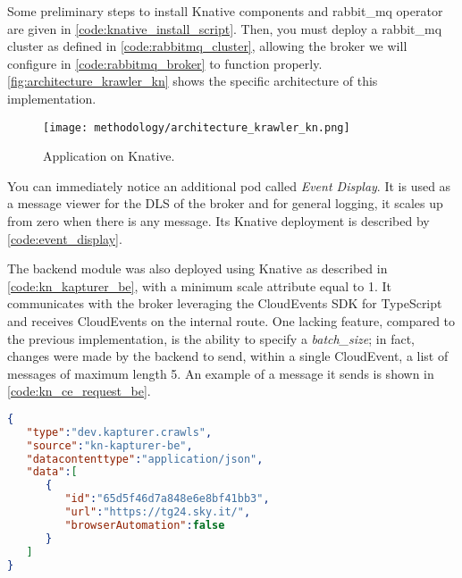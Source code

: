 \documentclass[../thesis.tex]{subfiles}
\begin{document}
Some preliminary steps to install Knative components and \gls{rabbit_mq} operator are given in \autoref{code:knative_install_script}. Then, you must deploy a \gls{rabbit_mq} cluster as defined in \autoref{code:rabbitmq_cluster}, allowing the broker we will configure in \autoref{code:rabbitmq_broker} to function properly. \autoref{fig:architecture_krawler_kn} shows the specific architecture of this implementation.

\begin{figure}[H]
    \centering
    \texttt{[image: methodology/architecture\_krawler\_kn.png]}
    \caption[Knative implementation]{Application on Knative.}
    \label{fig:architecture_krawler_kn}
\end{figure}

You can immediately notice an additional \gls{pod} called \textit{Event Display}. It is used as a message viewer for the \acrfull{DLS} of the broker and for general logging, it scales up from zero when there is any message. Its Knative deployment is described by \autoref{code:event_display}.

The backend module was also deployed using Knative as described in \autoref{code:kn_kapturer_be}, with a minimum scale attribute equal to 1. It communicates with the broker leveraging the CloudEvents \acrshort{SDK} \cite{site:cloudevents_js} for TypeScript and receives CloudEvents on the internal route. One lacking feature, compared to the previous implementation, is the ability to specify a \textit{batch\_size}; in fact, changes were made by the backend to send, within a single CloudEvent, a list of messages of maximum length 5. An example of a message it sends is shown in \autoref{code:kn_ce_request_be}.

\begin{lstlisting}[language=json, captionpos=b, caption={[Sample of search start message from backend]Example of search start message on Knative from backend module. The mandatory fields that CloudEvents must have were not reported.}, label={code:kn_ce_request_be}]
{
   "type":"dev.kapturer.crawls",
   "source":"kn-kapturer-be",
   "datacontenttype":"application/json",
   "data":[
      {
         "id":"65d5f46d7a848e6e8bf41bb3",
         "url":"https://tg24.sky.it/",
         "browserAutomation":false
      }
   ]
}
\end{lstlisting}
\end{document}
